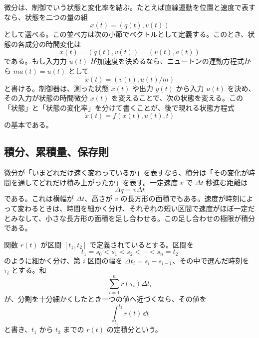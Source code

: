 微分は、制御でいう状態と変化率を結ぶ。たとえば直線運動を位置と速度で表すなら、状態を二つの量の組
\begin{equation}
  x(t)=(q(t),v(t))
\end{equation}
として選べる。この並べ方は次の小節でベクトルとして定義する。このとき、状態の各成分の時間変化は
\begin{equation}
  \dot{x}(t)=(\dot{q}(t),\dot{v}(t))=(v(t),a(t))
\end{equation}
である。もし入力力 $u(t)$ が加速度を決めるなら、ニュートンの運動方程式から $m a(t)=u(t)$ として
\begin{equation}
  \dot{x}(t)=(v(t),u(t)/m)
\end{equation}
と書ける。制御器は、測った状態 $x(t)$ や出力 $y(t)$ から入力 $u(t)$ を決め、その入力が状態の時間微分 $\dot{x}(t)$ を変えることで、次の状態を変える。この「状態」と「状態の変化率」を分けて書くことが、後で現れる状態方程式
\begin{equation}
  \dot{x}(t)=f(x(t),u(t),t)
\end{equation}
の基本である。

\subsection{積分、累積量、保存則}

微分が「いまどれだけ速く変わっているか」を表すなら、積分は「その変化が時間を通してどれだけ積み上がったか」を表す。一定速度 $v$ で $\Delta t$ 秒進む距離は
\begin{equation}
  \Delta q=v\Delta t
\end{equation}
である。これは横幅が $\Delta t$、高さが $v$ の長方形の面積でもある。速度が時刻によって変わるときは、時間を細かく分け、それぞれの短い区間で速度がほぼ一定だとみなして、小さな長方形の面積を足し合わせる。この足し合わせの極限が積分である。

\begin{definition}[定積分]
関数 $r(t)$ が区間 $[t_1,t_2]$ で定義されているとする。区間を
\begin{equation}
  t_1=s_0<s_1<s_2<\cdots<s_n=t_2
\end{equation}
のように細かく分け、第 $i$ 区間の幅を $\Delta t_i=s_i-s_{i-1}$、その中で選んだ時刻を $\tau_i$ とする。和
\begin{equation}
  \sum_{i=1}^{n} r(\tau_i)\Delta t_i
\end{equation}
が、分割を十分細かくしたとき一つの値へ近づくなら、その値を
\begin{equation}
  \int_{t_1}^{t_2} r(t)\,\dd t
\end{equation}
と書き、$t_1$ から $t_2$ までの $r(t)$ の定積分という。
\end{definition}

